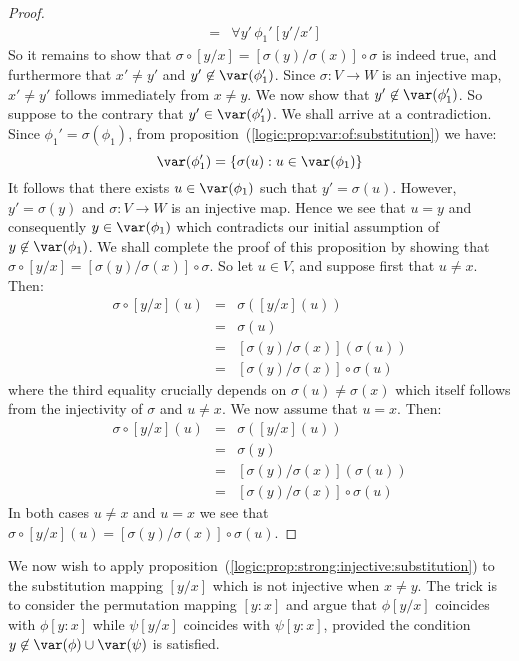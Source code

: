 \begin{proof}
\begin{eqnarray*}
    &=&\forall y'\,\phi_{1}'[y'/x']
    \end{eqnarray*}
So it remains to show that
$\sigma\circ[y/x]=[\sigma(y)/\sigma(x)]\circ\sigma$ is indeed true,
and furthermore that $x'\neq y'$ and $y'\not\in\var(\phi_{1}')$.
Since $\sigma:V\to W$ is an injective map, $x'\neq y'$ follows
immediately from $x\neq y$. We now show that
$y'\not\in\var(\phi_{1}')$. So suppose to the contrary that
$y'\in\var(\phi_{1}')$. We shall arrive at a contradiction. Since
$\phi_{1}'=\sigma(\phi_{1})$, from
proposition~(\ref{logic:prop:var:of:substitution}) we have:
 \[ \var(\phi_{1}')=\{\sigma(u):u\in\var(\phi_{1})\}
 \]
It follows that there exists $u\in\var(\phi_{1})$ such that
$y'=\sigma(u)$. However, $y'=\sigma(y)$ and $\sigma:V\to W$ is an
injective map. Hence we see that $u=y$ and consequently
$y\in\var(\phi_{1})$ which contradicts our initial assumption of
$y\not\in\var(\phi_{1})$. We shall complete the proof of this
proposition by showing that
$\sigma\circ[y/x]=[\sigma(y)/\sigma(x)]\circ\sigma$. So let $u\in
V$, and suppose first that $u\neq x$. Then:
    \begin{eqnarray*}
    \sigma\circ[y/x](u)&=&\sigma([y/x](u))\\
    &=&\sigma(u)\\
    &=&[\sigma(y)/\sigma(x)](\sigma(u))\\
    &=&[\sigma(y)/\sigma(x)]\circ\sigma(u)
    \end{eqnarray*}
where the third equality crucially depends on
$\sigma(u)\neq\sigma(x)$ which itself follows from the injectivity
of $\sigma$ and $u\neq x$. We now assume that $u=x$. Then:
     \begin{eqnarray*}
    \sigma\circ[y/x](u)&=&\sigma([y/x](u))\\
    &=&\sigma(y)\\
    &=&[\sigma(y)/\sigma(x)](\sigma(u))\\
    &=&[\sigma(y)/\sigma(x)]\circ\sigma(u)
    \end{eqnarray*}
In both cases $u\neq x$ and $u=x$ we see that
$\sigma\circ[y/x](u)=[\sigma(y)/\sigma(x)]\circ\sigma(u)$.
\end{proof}

We now wish to apply
proposition~(\ref{logic:prop:strong:injective:substitution}) to the
substitution mapping $[y/x]$ which is not injective when $x\neq y$.
The trick is to consider the permutation mapping $[y\!:\!x]$ and
argue that $\phi[y/x]$ coincides with $\phi[y\!:\!x]$ while
$\psi[y/x]$ coincides with $\psi[y\!:\!x]$, provided the condition
$y\not\in\var(\phi)\cup\var(\psi)$ is satisfied.

